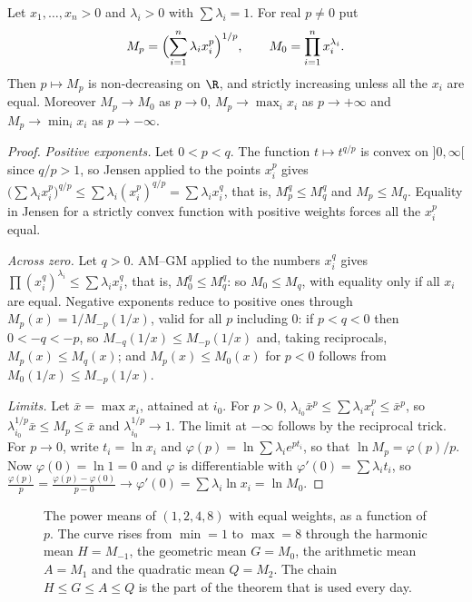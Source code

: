 \begin{theorem}\label{thm:powermeans}
Let $x_1,\dots,x_n>0$ and $\lambda_i>0$ with $\sum\lambda_i=1$. For real $p\ne0$ put
\[
M_p=\Bigl(\sum_{i=1}^n\lambda_ix_i^p\Bigr)^{1/p},\qquad M_0=\prod_{i=1}^nx_i^{\lambda_i}.
\]
Then $p\mapsto M_p$ is non-decreasing on $\R$, and strictly increasing unless all the $x_i$ are equal. Moreover $M_p\to M_0$ as $p\to0$,
$M_p\to\max_ix_i$ as $p\to+\infty$ and $M_p\to\min_ix_i$ as $p\to-\infty$.
\end{theorem}
\begin{proof}
\emph{Positive exponents.} Let $0<p<q$. The function $t\mapsto t^{q/p}$ is convex on $]0,\infty[$ since $q/p>1$, so Jensen applied to the points
$x_i^p$ gives $\bigl(\sum\lambda_ix_i^p\bigr)^{q/p}\le\sum\lambda_i(x_i^p)^{q/p}=\sum\lambda_ix_i^q$, that is, $M_p^q\le M_q^q$ and $M_p\le M_q$.
Equality in Jensen for a strictly convex function with positive weights forces all the $x_i^p$ equal.

\emph{Across zero.} Let $q>0$. AM--GM applied to the numbers $x_i^q$ gives $\prod(x_i^q)^{\lambda_i}\le\sum\lambda_ix_i^q$, that is, $M_0^q\le M_q^q$:
so $M_0\le M_q$, with equality only if all $x_i$ are equal. Negative exponents reduce to positive ones through $M_p(x)=1/M_{-p}(1/x)$, valid for all
$p$ including $0$: if $p<q<0$ then $0<-q<-p$, so $M_{-q}(1/x)\le M_{-p}(1/x)$ and, taking reciprocals, $M_p(x)\le M_q(x)$; and $M_p(x)\le M_0(x)$ for
$p<0$ follows from $M_0(1/x)\le M_{-p}(1/x)$.

\emph{Limits.} Let $\bar x=\max x_i$, attained at $i_0$. For $p>0$, $\lambda_{i_0}\bar x^p\le\sum\lambda_ix_i^p\le\bar x^p$, so
$\lambda_{i_0}^{1/p}\bar x\le M_p\le\bar x$ and $\lambda_{i_0}^{1/p}\to1$. The limit at $-\infty$ follows by the reciprocal trick. For $p\to0$, write
$t_i=\ln x_i$ and $\varphi(p)=\ln\sum\lambda_ie^{pt_i}$, so that $\ln M_p=\varphi(p)/p$. Now $\varphi(0)=\ln1=0$ and $\varphi$ is differentiable with
$\varphi'(0)=\sum\lambda_it_i$, so $\frac{\varphi(p)}p=\frac{\varphi(p)-\varphi(0)}{p-0}\to\varphi'(0)=\sum\lambda_i\ln x_i=\ln M_0$.
\end{proof}

\begin{figure}[ht]
\centering
{}
\caption{The power means of $(1,2,4,8)$ with equal weights, as a function of $p$. The curve rises from $\min=1$ to $\max=8$ through the harmonic mean $H=M_{-1}$, the geometric mean $G=M_0$, the arithmetic mean $A=M_1$ and the quadratic mean $Q=M_2$. The chain $H\le G\le A\le Q$ is the part of the theorem that is used every day.}
\label{fig:powermeans}
\end{figure}

